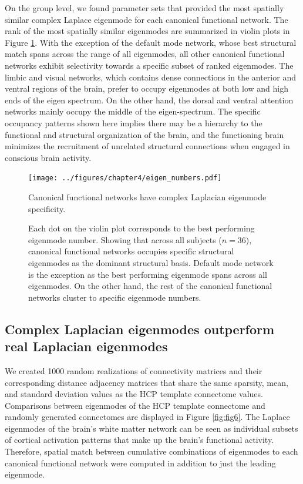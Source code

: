On the group level, we found parameter sets that provided the most spatially similar complex Laplace eigenmode for each canonical functional network. The rank of the most spatially similar eigenmodes are summarized in violin plots in Figure \ref{fig:fig5}. With  the exception of the default mode network, whose best structural match spans across the range of all eigenmodes, all other canonical functional networks exhibit selectivity towards a specific subset of ranked eigenmodes. The limbic and visual networks, which contains dense connections in the anterior and ventral regions of the brain,  prefer to occupy eigenmodes at both low and high ends of the eigen spectrum. On the other hand, the dorsal and ventral attention networks mainly occupy the middle of the eigen-spectrum. The specific occupancy patterns shown here implies there may be a hierarchy to the functional and structural organization of the brain, and the functioning brain minimizes the recruitment of unrelated structural connections when engaged in conscious brain activity. 

\begin{figure}[ht]
\texttt{[image: ../figures/chapter4/eigen\_numbers.pdf]}
\caption{Canonical functional networks have complex Laplacian eigenmode specificity.}
\caption*{Each dot on the violin plot corresponds to the best performing eigenmode number. Showing that across all subjects ($n = 36$), canonical functional networks occupies specific structural eigenmodes as the dominant structural basis. Default mode network is the exception as the best performing eigenmode spans across all eigenmodes. On the other hand, the rest of the canonical functional networks cluster to specific eigenmode numbers.
}
\label{fig:fig5}
\end{figure}

\subsection{Complex Laplacian eigenmodes outperform real Laplacian eigenmodes}
We created 1000 random realizations of connectivity matrices and their corresponding distance adjacency matrices that share the same sparsity, mean, and standard deviation values as the HCP template connectome values. Comparisons between eigenmodes of the HCP template connectome and randomly generated connectomes are displayed in Figure \ref{fig:fig6}. The Laplace eigenmodes of the brain's white matter network can be seen as individual subsets of cortical activation patterns that make up the brain's functional activity. Therefore, spatial match between cumulative combinations of eigenmodes to each canonical functional network were computed in addition to just the leading eigenmode. 

